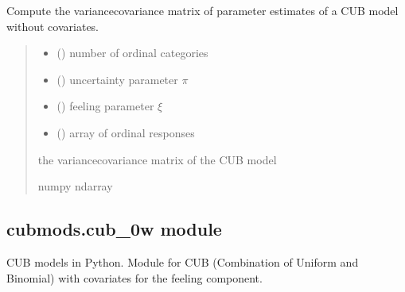 \documentclass[letterpaper,10pt,english]{sphinxmanual}
\begin{document}
\begin{fulllineitems}
\label{\detokenize{cubmods:cubmods.cub.varcov}}
\pysigstartsignatures
{}
\pysigstopsignatures
\sphinxAtStartPar
Compute the variance\sphinxhyphen{}covariance matrix of parameter 
estimates of a CUB model without covariates.
\begin{quote}\begin{description}
\begin{itemize}
\item {} 
\sphinxAtStartPar
{} () \textendash{} number of ordinal categories

\item {} 
\sphinxAtStartPar
{} () \textendash{} uncertainty parameter \(\pi\)

\item {} 
\sphinxAtStartPar
{} () \textendash{} feeling parameter \(\xi\)

\item {} 
\sphinxAtStartPar
{} () \textendash{} array of ordinal responses

\end{itemize}

\sphinxAtStartPar
the variance\sphinxhyphen{}covariance matrix of the CUB model

\sphinxAtStartPar
numpy ndarray

\end{description}\end{quote}

\end{fulllineitems}



\subsection{cubmods.cub\_0w module}
\label{\detokenize{cubmods:module-cubmods.cub_0w}}\label{\detokenize{cubmods:cubmods-cub-0w-module}}\label{\detokenize{cubmods:cub0w-module}}
\sphinxAtStartPar
CUB models in Python.
Module for CUB (Combination of Uniform
and Binomial) with covariates for the feeling component.
\end{document}
